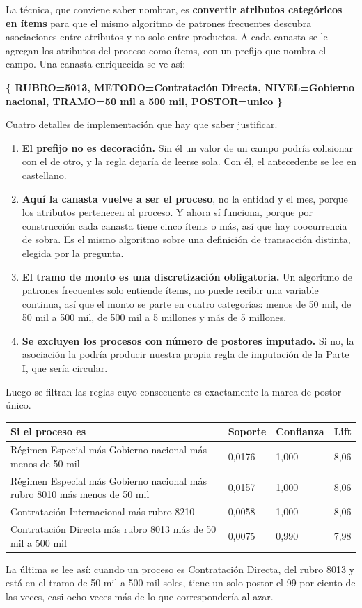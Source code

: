 \documentclass[11pt]{article}
\begin{document}
La técnica, que conviene saber nombrar, es \textbf{convertir atributos categóricos en ítems} para que el mismo algoritmo de patrones frecuentes descubra asociaciones entre atributos y no solo entre productos. A cada canasta se le agregan los atributos del proceso como ítems, con un prefijo que nombra el campo. Una canasta enriquecida se ve así:

\textbf{\{ RUBRO=\allowbreak{}5013, METODO=\allowbreak{}Contratación Directa, NIVEL=\allowbreak{}Gobierno nacional, TRAMO=\allowbreak{}50 mil a 500 mil, POSTOR=\allowbreak{}unico \}}

Cuatro detalles de implementación que hay que saber justificar.

\begin{enumerate}
  \item \textbf{El prefijo no es decoración.} Sin él un valor de un campo podría colisionar con el de otro, y la regla dejaría de leerse sola. Con él, el antecedente se lee en castellano.
  \item \textbf{Aquí la canasta vuelve a ser el proceso}, no la entidad y el mes, porque los atributos pertenecen al proceso. Y ahora sí funciona, porque por construcción cada canasta tiene cinco ítems o más, así que hay coocurrencia de sobra. Es el mismo algoritmo sobre una definición de transacción distinta, elegida por la pregunta.
  \item \textbf{El tramo de monto es una discretización obligatoria.} Un algoritmo de patrones frecuentes solo entiende ítems, no puede recibir una variable continua, así que el monto se parte en cuatro categorías: menos de 50 mil, de 50 mil a 500 mil, de 500 mil a 5 millones y más de 5 millones.
  \item \textbf{Se excluyen los procesos con número de postores imputado.} Si no, la asociación la podría producir nuestra propia regla de imputación de la Parte I, que sería circular.
\end{enumerate}
Luego se filtran las reglas cuyo consecuente es exactamente la marca de postor único.

\begin{center}\footnotesize
\begin{tabularx}{\linewidth}{Q{2.258}Q{0.642}Q{0.733}Q{0.367}}
\toprule
\textbf{Si el proceso es} & \textbf{Soporte} & \textbf{Confianza} & \textbf{Lift} \\
\midrule
Régimen Especial más Gobierno nacional más menos de 50 mil & 0,0176 & 1,000 & 8,06 \\
Régimen Especial más Gobierno nacional más rubro 8010 más menos de 50 mil & 0,0157 & 1,000 & 8,06 \\
Contratación Internacional más rubro 8210 & 0,0058 & 1,000 & 8,06 \\
Contratación Directa más rubro 8013 más de 50 mil a 500 mil & 0,0075 & 0,990 & 7,98 \\
\bottomrule
\end{tabularx}
\end{center}
La última se lee así: cuando un proceso es Contratación Directa, del rubro 8013 y está en el tramo de 50 mil a 500 mil soles, tiene un solo postor el 99 por ciento de las veces, casi ocho veces más de lo que correspondería al azar.
\end{document}
